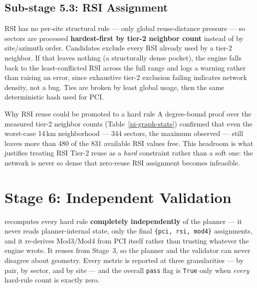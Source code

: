 \subsection{Sub-stage 5.3: RSI Assignment}

RSI has no per-site structural rule --- only global reuse-distance pressure ---
so sectors are processed \textbf{hardest-first by tier-2 neighbor count}
instead of by site/azimuth order. Candidates exclude every RSI already used by
a tier-2 neighbor. If that leaves nothing (a structurally dense pocket), the
engine falls back to the least-conflicted RSI across the full range and logs a
warning rather than raising an error, since exhaustive tier-2 exclusion failing
indicates network density, not a bug. Ties are broken by least global usage,
then the same deterministic hash used for PCI.

\begin{infobox}{Why RSI reuse could be promoted to a hard rule}
A degree-bound proof over the measured tier-2 neighbor counts
(Table~\ref{pi-graph-stats}) confirmed that even the worst-case 14\,km
neighborhood --- 344 sectors, the maximum observed --- still leaves more than
480 of the 831 available RSI values free. This headroom is what justifies
treating RSI Tier-2 reuse as a \emph{hard} constraint rather than a soft one:
the network is never so dense that zero-reuse RSI assignment becomes
infeasible.
\end{infobox}

\section{Stage 6: Independent Validation}
\label{sec:pi-validation}

 recomputes every hard rule \textbf{completely
independently} of the planner --- it never reads planner-internal state, only
the final \texttt{\{pci, rsi, mod4\}} assignments, and it re-derives Mod3/Mod4
from PCI itself rather than trusting whatever the engine wrote. It reuses
 from Stage~3, so the planner and the validator can never
disagree about geometry. Every metric is reported at three granularities ---
by pair, by sector, and by site --- and the overall \texttt{pass} flag is
\texttt{True} only when \emph{every} hard-rule count is exactly zero.


